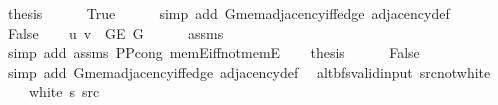 \begin{isabellebody}
\ {\isacharquery}{\kern0pt}thesis\isanewline
\ \ \ \ \isamarkupfalse%
\ True\isanewline
\ \ \ \ \isamarkupfalse%
\ {\isacharparenleft}{\kern0pt}simp\ add{\isacharcolon}{\kern0pt}\ G{}{\isachardot}{\kern0pt}mem{\isacharunderscore}{\kern0pt}adjacency{\isacharunderscore}{\kern0pt}iff{\isacharunderscore}{\kern0pt}edge\ adjacency{\isacharunderscore}{\kern0pt}def{\isacharparenright}{\kern0pt}\isanewline
{}\isamarkupfalse%
\isanewline
\ \ \isamarkupfalse%
\ False\isanewline
\ \ \isamarkupfalse%
\ {\isachardoublequoteopen}{\isacharbraceleft}{\kern0pt}u{\isacharcomma}{\kern0pt}\ v{\isacharbraceright}{\kern0pt}\ {\isasymin}\ G{\isachardot}{\kern0pt}E\ G{}{\isachardoublequoteclose}\isanewline
\ \ \ \ \isamarkupfalse%
\ assms{\isacharparenleft}{\kern0pt}{}{\isacharparenright}{\kern0pt}\isanewline
\ \ \ \ \isamarkupfalse%
\ {\isacharparenleft}{\kern0pt}simp\ add{\isacharcolon}{\kern0pt}\ assms{\isacharparenleft}{\kern0pt}{}{\isacharparenright}{\kern0pt}\ P{\isacharunderscore}{\kern0pt}P{\isacharprime}{\kern0pt}{\isacharprime}{\kern0pt}{\isacharunderscore}{\kern0pt}cong\ mem{\isacharunderscore}{\kern0pt}E{}{\isacharunderscore}{\kern0pt}iff{\isacharunderscore}{\kern0pt}not{\isacharunderscore}{\kern0pt}mem{\isacharunderscore}{\kern0pt}E{}{\isacharparenright}{\kern0pt}\isanewline
\ \ \isamarkupfalse%
\ {\isacharquery}{\kern0pt}thesis\isanewline
\ \ \ \ \isamarkupfalse%
\ False\isanewline
\ \ \ \ \isamarkupfalse%
\ {\isacharparenleft}{\kern0pt}simp\ add{\isacharcolon}{\kern0pt}\ G{}{\isachardot}{\kern0pt}mem{\isacharunderscore}{\kern0pt}adjacency{\isacharunderscore}{\kern0pt}iff{\isacharunderscore}{\kern0pt}edge\ adjacency{\isacharunderscore}{\kern0pt}def{\isacharparenright}{\kern0pt}\isanewline
{}\isamarkupfalse%
%
\endisatagproof
{\isafoldproof}%
%
\isadelimproof
\isanewline
%
\endisadelimproof
\isanewline
{}\isamarkupfalse%
\ {\isacharparenleft}{\kern0pt}\ alt{\isacharunderscore}{\kern0pt}bfs{\isacharunderscore}{\kern0pt}valid{\isacharunderscore}{\kern0pt}input{\isacharparenright}{\kern0pt}\ src{\isacharunderscore}{\kern0pt}not{\isacharunderscore}{\kern0pt}white{\isacharcolon}{\kern0pt}\isanewline
\ \ \ {\isachardoublequoteopen}{\isasymnot}\ white\ s\ src{\isachardoublequoteclose}\isanewline
%
\isadelimproof
\ \ %
\endisadelimproof
%
\isatagproof
{}\isamarkupfalse%

\end{isabellebody}
